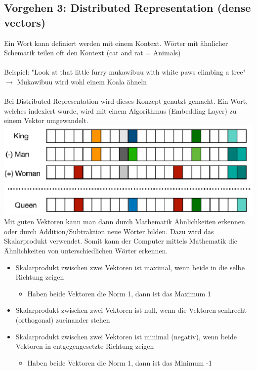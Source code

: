 \subsection{Vorgehen 3: Distributed Representation (dense vectors)}
Ein Wort kann definiert werden mit einem Kontext. Wörter mit ähnlicher Schematik teilen oft den Kontext (cat and rat = Animals)
\\\\
Beispiel: "Look at that little furry mukawibuu with white paws climbing a tree" $\rightarrow$ Mukawibuu wird wohl einem Koala ähneln
\\\\
Bei Distributed Representation wird dieses Konzept genutzt gemacht. Ein Wort, welches indexiert wurde, wird mit einem Algorithmus (Embedding Layer) zu einem Vektor umgewandelt.
\\
\includegraphics[width=\linewidth]{img/distrubuted-representation.png}
\\
Mit guten Vektoren kann man dann durch Mathematik Ähnlichkeiten erkennen oder durch Addition/Subtraktion neue Wörter bilden. Dazu wird das Skalarprodukt verwendet. Somit kann der Computer mittels Mathematik die Ähnlichkeiten von unterschiedlichen Wörter erkennen.

\begin{itemize}
\item Skalarprodukt zwischen zwei Vektoren ist maximal, wenn beide in die selbe Richtung zeigen
\begin{itemize}
\item Haben beide Vektoren die Norm 1, dann ist das Maximum 1
\end{itemize}
\item Skalarprodukt zwischen zwei Vektoren ist null, wenn die Vektoren senkrecht (orthogonal) zueinander stehen
\item Skalarprodukt zwischen zwei Vektoren ist minimal (negativ), wenn beide Vektoren in entgegengesetzte Richtung zeigen
\begin{itemize}
\item Haben beide Vektoren die Norm 1, dann ist das Minimum -1
\end{itemize}
\end{itemize}

